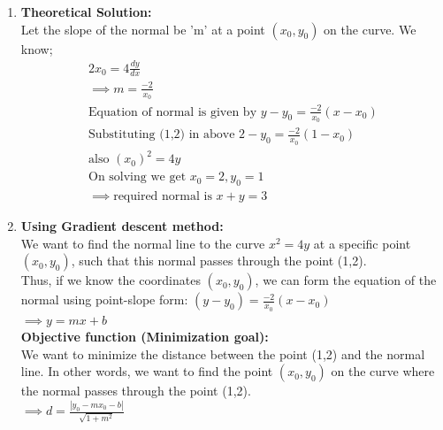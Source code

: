 \documentclass[journal]{IEEEtran}
\begin{document}
\begin{enumerate}
    \item \textbf{Theoretical Solution:}\\ 
    Let the slope of the normal be 'm' at a point $(x_0,y_0)$ on the curve. We know;  
    \begin{align}
             \text{$2x_0=4$}\frac{dy}{dx}\\
        \implies m=\frac{-2}{x_0}\\
        \text{Equation of normal is given by }y-y_0=\frac{-2}{x_0}(x-x_0)\\
       \text{Substituting (1,2) in above }2-y_0=\frac{-2}{x_0}(1-x_0)\\
       \text{also } (x_0)^2=4y\\
        \text{On solving we get }x_0=2,y_0=1\\
        \implies \text{required normal is } x+y=3
    \end{align}
    \item \textbf{Using Gradient descent method: }\\ 
    We want to find the normal line to the curve $x^2=4y$ at a specific point $(x_0,y_0)$, such that this normal passes through the point (1,2).\\
    
    Thus, if we know the coordinates $(x_0,y_0)$,  we can form the equation of the normal using point-slope form: $(y-y_0)=\frac{-2}{x_0}(x-x_0)$\\ $\implies y=mx+b$\\
    
    \textbf{Objective function (Minimization goal): }\\
    We want to minimize the distance between the point (1,2) and the normal line. In other words, we want to find the point $(x_0,y_0)$ on the curve where the normal passes through the point (1,2).\\
    
    $\implies d = \frac{|y_0-mx_0-b|}{\sqrt{1+m^2}}$\\


\end{enumerate}
\end{document}
